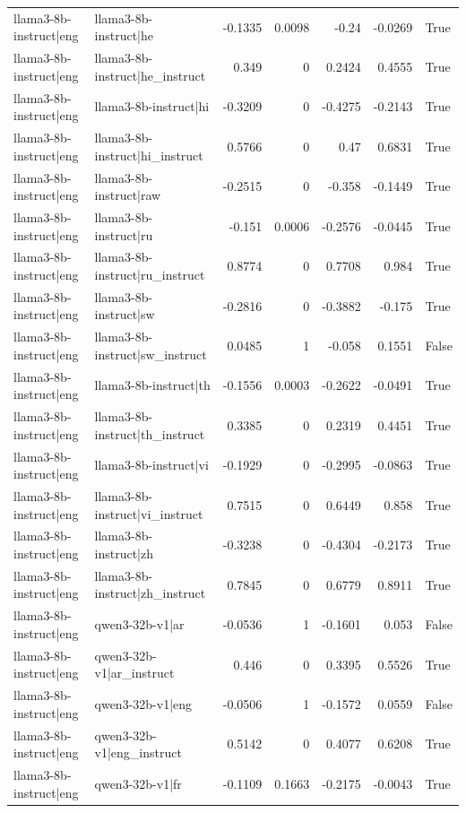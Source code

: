 \begin{table}
\begin{tabular}{l l r r r r l}
llama3-8b-instruct|eng & llama3-8b-instruct|he & -0.1335 & 0.0098 & -0.24 & -0.0269 & True \\
llama3-8b-instruct|eng & llama3-8b-instruct|he_instruct & 0.349 & 0 & 0.2424 & 0.4555 & True \\
llama3-8b-instruct|eng & llama3-8b-instruct|hi & -0.3209 & 0 & -0.4275 & -0.2143 & True \\
llama3-8b-instruct|eng & llama3-8b-instruct|hi_instruct & 0.5766 & 0 & 0.47 & 0.6831 & True \\
llama3-8b-instruct|eng & llama3-8b-instruct|raw & -0.2515 & 0 & -0.358 & -0.1449 & True \\
llama3-8b-instruct|eng & llama3-8b-instruct|ru & -0.151 & 0.0006 & -0.2576 & -0.0445 & True \\
llama3-8b-instruct|eng & llama3-8b-instruct|ru_instruct & 0.8774 & 0 & 0.7708 & 0.984 & True \\
llama3-8b-instruct|eng & llama3-8b-instruct|sw & -0.2816 & 0 & -0.3882 & -0.175 & True \\
llama3-8b-instruct|eng & llama3-8b-instruct|sw_instruct & 0.0485 & 1 & -0.058 & 0.1551 & False \\
llama3-8b-instruct|eng & llama3-8b-instruct|th & -0.1556 & 0.0003 & -0.2622 & -0.0491 & True \\
llama3-8b-instruct|eng & llama3-8b-instruct|th_instruct & 0.3385 & 0 & 0.2319 & 0.4451 & True \\
llama3-8b-instruct|eng & llama3-8b-instruct|vi & -0.1929 & 0 & -0.2995 & -0.0863 & True \\
llama3-8b-instruct|eng & llama3-8b-instruct|vi_instruct & 0.7515 & 0 & 0.6449 & 0.858 & True \\
llama3-8b-instruct|eng & llama3-8b-instruct|zh & -0.3238 & 0 & -0.4304 & -0.2173 & True \\
llama3-8b-instruct|eng & llama3-8b-instruct|zh_instruct & 0.7845 & 0 & 0.6779 & 0.8911 & True \\
llama3-8b-instruct|eng & qwen3-32b-v1|ar & -0.0536 & 1 & -0.1601 & 0.053 & False \\
llama3-8b-instruct|eng & qwen3-32b-v1|ar_instruct & 0.446 & 0 & 0.3395 & 0.5526 & True \\
llama3-8b-instruct|eng & qwen3-32b-v1|eng & -0.0506 & 1 & -0.1572 & 0.0559 & False \\
llama3-8b-instruct|eng & qwen3-32b-v1|eng_instruct & 0.5142 & 0 & 0.4077 & 0.6208 & True \\
llama3-8b-instruct|eng & qwen3-32b-v1|fr & -0.1109 & 0.1663 & -0.2175 & -0.0043 & True \\

\end{tabular}
\end{table}
